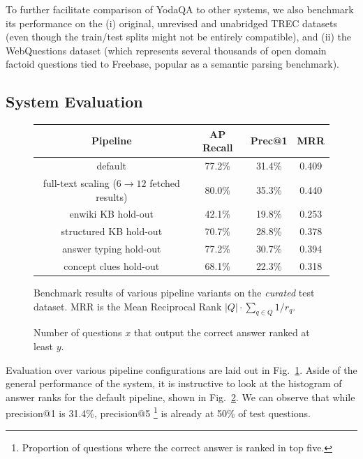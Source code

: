 To further facilitate comparison of YodaQA to other systems,
we also benchmark its performance on the (i) original, unrevised and
unabridged TREC datasets
(even though the train/test splits might not be entirely compatible),
and (ii) the WebQuestions dataset \citep{Semantic2013Berant}
(which represents several thousands of open domain factoid questions
tied to Freebase, popular as a semantic parsing benchmark).

\subsection{System Evaluation}

\begin{figure}[ht]
\renewcommand{\arraystretch}{1.3}
\centering
\begin{tabular}{|c|ccc|}
\hline
Pipeline & AP Recall & Prec@1 & MRR \\ \hline \hline
default & 77.2\% & 31.4\% & 0.409 \\
\hline
full-text scaling ($6\to12$ fetched results) & 80.0\% & 35.3\% & 0.440 \\
enwiki KB hold-out & 42.1\% & 19.8\% & 0.253 \\
structured KB hold-out & 70.7\% & 28.8\% & 0.378 \\
\hline
answer typing hold-out & 77.2\% & 30.7\% & 0.394 \\
concept clues hold-out & 68.1\% & 22.3\% & 0.318 \\
\hline
\end{tabular}
\vspace*{-0.2cm}
\caption{Benchmark results of various pipeline variants on the \textit{curated} test dataset.
MRR is the Mean Reciprocal Rank $|Q|\cdot\sum_{q\in Q}{1/r_q}$.}
\label{fig:holdoutbench}
\end{figure}

\begin{figure}[ht]
\begin{center}
\vspace*{-0.75cm}
\caption{Number of questions $x$ that output the correct answer ranked at least $y$.}
\label{fig:ranks}
\end{center}
\end{figure}%

Evaluation over various pipeline configurations are laid out in Fig.~\ref{fig:holdoutbench}.
Aside of the general performance of the system,
it is instructive to look at the histogram of answer ranks
for the default pipeline, shown in Fig.~\ref{fig:ranks}.
We can observe that while precision@1 is 31.4\%,
precision@5%
\footnote{Proportion of questions where the correct answer is ranked in top five.}
is already at 50\% of test questions.

